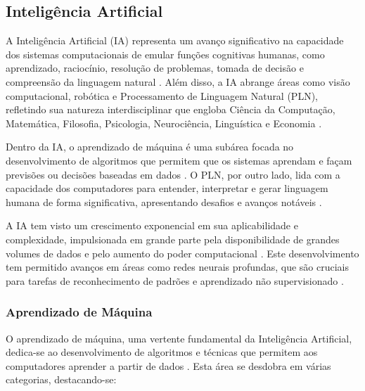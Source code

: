 \documentclass[conference]{IEEEtran}
\begin{document}
\subsection{Inteligência Artificial}
A Inteligência Artificial (IA) representa um avanço significativo na capacidade 
dos sistemas computacionais de emular funções cognitivas humanas, como 
aprendizado, raciocínio, resolução de problemas, tomada de decisão 
e compreensão da linguagem natural \cite{Russell2016}. 
Além disso, a IA abrange áreas como visão computacional, robótica e 
Processamento de Linguagem Natural (PLN), refletindo sua natureza interdisciplinar 
que engloba Ciência da Computação, Matemática, Filosofia, Psicologia, 
Neurociência, Linguística e Economia \cite{Poole2010}.

Dentro da IA, o aprendizado de máquina é uma subárea focada no desenvolvimento de 
algoritmos que permitem que os sistemas aprendam e 
façam previsões ou decisões baseadas em dados \cite{Alpaydin2020}. 
O PLN, por outro lado, lida com a capacidade dos computadores para entender, 
interpretar e gerar linguagem humana de forma significativa, 
apresentando desafios e avanços notáveis \cite{Jurafsky2020}.

A IA tem visto um crescimento exponencial em sua aplicabilidade e complexidade, 
impulsionada em grande parte pela disponibilidade de grandes volumes de dados e 
pelo aumento do poder computacional \cite{Goodfellow2016}. 
Este desenvolvimento tem permitido avanços em áreas como redes neurais profundas, 
que são cruciais para tarefas de reconhecimento de padrões 
e aprendizado não supervisionado \cite{LeCun2015}.

\subsubsection{Aprendizado de Máquina} 

O aprendizado de máquina, uma vertente fundamental da Inteligência Artificial, 
dedica-se ao desenvolvimento de algoritmos e técnicas que permitem aos computadores 
aprender a partir de dados \cite{Bishop2006}. 
Esta área se desdobra em várias categorias, destacando-se:
\end{document}
